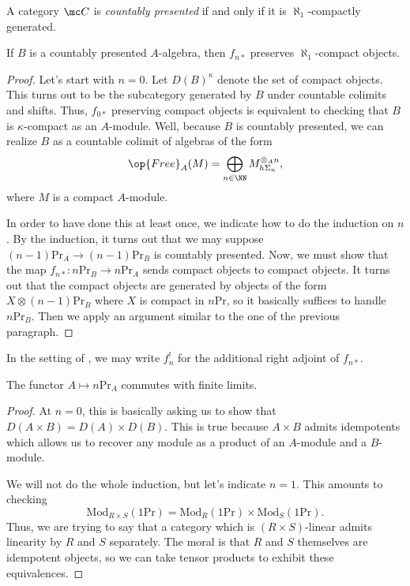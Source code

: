 \documentclass[../notes.tex]{subfiles}
\begin{document}
\begin{definition}
	A category $\mc C$ is \textit{countably presented} if and only if it is $\aleph_1$-compactly generated.
\end{definition}
\begin{proposition} \label{prop:get-shriek}
	If $B$ is a countably presented $A$-algebra, then $f_{n*}$ preserves $\aleph_1$-compact objects.
\end{proposition}
\begin{proof}
	Let's start with $n=0$. Let $D(B)^{\kappa}$ denote the set of compact objects. This turns out to be the subcategory generated by $B$ under countable colimits and shifts. Thus, $f_{0*}$ preserving compact objects is equivalent to checking that $B$ is $\kappa$-compact as an $A$-module. Well, because $B$ is countably presented, we can realize $B$ as a countable colimit of algebras of the form
	\[\op{Free}_A(M)=\bigoplus_{n\in\NN}M^{\otimes_An}_{h\Sigma_n},\]
	where $M$ is a compact $A$-module.

	In order to have done this at least once, we indicate how to do the induction on $n$. By the induction, it turns out that
	we may suppose $(n-1)\mathrm{Pr}_A\to(n-1)\mathrm{Pr}_B$ is countably presented. Now, we must show that the map $f_{n*}\colon n\mathrm{Pr}_B\to n\mathrm{Pr}_A$ sends compact objects to compact objects. It turns out that the compact objects are generated by objects of the form $X\otimes(n-1)\mathrm{Pr}_B$ where $X$ is compact in $n\mathrm{Pr}$, so it basically suffices to handle $n\mathrm{Pr}_B$. Then we apply an argument similar to the one of the previous paragraph.
\end{proof}
\begin{remark}
	In the setting of , we may write $f_n^!$ for the additional right adjoint of $f_{n*}$.
\end{remark}
\begin{lemma} \label{lem:pr-commutes-limits}
	The functor $A\mapsto n\mathrm{Pr}_A$ commutes with finite limits.
\end{lemma}
\begin{proof}
	At $n=0$, this is basically asking us to show that $D(A\times B)=D(A)\times D(B)$. This is true because $A\times B$ admits idempotents which allows us to recover any module as a product of an $A$-module and a $B$-module.

	We will not do the whole induction, but let's indicate $n=1$. This amounts to checking
	\[\mathrm{Mod}_{R\times S}(1\mathrm{Pr})=\mathrm{Mod}_R(1\mathrm{Pr})\times\mathrm{Mod}_S(1\mathrm{Pr}).\]
	Thus, we are trying to say that a category which is $(R\times S)$-linear admits linearity by $R$ and $S$ separately. The moral is that $R$ and $S$ themselves are idempotent objects, so we can take tensor products to exhibit these equivalences.
\end{proof}
\end{document}
